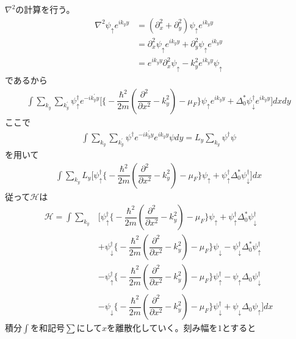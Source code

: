 \documentclass{jarticle}
\begin{document}
$\nabla^2$の計算を行う。
\begin{align}
\nabla^{2}\psi_{\uparrow}e^{ik_yy}&=(\partial_x^2+\partial_y^2)\psi_{\uparrow}e^{ik_yy}\\
                                                      &=\partial_x^2\psi_{\uparrow}e^{ik_yy}+\partial_y^2\psi_{\uparrow}e^{ik_yy}\\
                                                    &=e^{ik_yy}\partial_x^2\psi_{\uparrow}-k^{2}_ye^{ik_yy}\psi_{\uparrow}
\end{align}
であるから
\begin{align}
\int\displaystyle\sum_{k_y}\sum_{k_y^{'}}\psi_{\uparrow}^{\dagger}e^{-ik_y^{'}y}\Big[\big\{-\dfrac{\hbar^2}{2m}(\dfrac{\partial^{2}}{\partial x^2}-k^{2}_y)-\mu_F\big\}\psi_{\uparrow}e^{ik_yy}+\Delta^{*}_0\psi_{\downarrow}^{\dagger}e^{ik_yy}\Big]dxdy
\end{align}
ここで
\begin{align}
\int\displaystyle\sum_{k_y}\sum_{k_y^{'}}\psi^{\dagger}e^{-ik_y^{'}y}e^{ik_yy}{\psi}dy=L_y\sum_{k_y}\psi^{\dagger}\psi
\end{align}
を用いて
\begin{align}
\int\displaystyle\sum_{k_y}L_y\Big[\psi_{\uparrow}^{\dagger}\big\{-\dfrac{\hbar^2}{2m}(\dfrac{\partial^{2}}{\partial x^2}-k^{2}_y)-\mu_F\big\}\psi_{\uparrow}+\psi_{\uparrow}^{\dagger}\Delta^{*}_0\psi_{\downarrow}^{\dagger}\Big]dx
\end{align}
従って$\mathcal{H}$は
\begin{align}
\mathcal{H}=\int\displaystyle\sum_{k_y}&\Big[\psi_{\uparrow}^{\dagger}\big\{-\dfrac{\hbar^2}{2m}(\dfrac{\partial^{2}}{\partial x^2}-k^{2}_y)-\mu_F\big\}\psi_{\uparrow}+\psi_{\uparrow}^{\dagger}\Delta^{*}_0\psi_{\downarrow}^{\dagger}\\
&+\psi_{\downarrow}^{\dagger}\big\{-\dfrac{\hbar^2}{2m}(\dfrac{\partial^{2}}{\partial x^2}-k^{2}_y)-\mu_F\big\}\psi_{\downarrow}-\psi_{\downarrow}^{\dagger}\Delta^{*}_0\psi_{\uparrow}^{\dagger}\\
&-\psi_{\uparrow}^{\dagger}\big\{-\dfrac{\hbar^2}{2m}(\dfrac{\partial^{2}}{\partial x^2}-k^{2}_y)-\mu_F\big\}\psi_{\uparrow}^{\dagger}-\psi_{\uparrow}\Delta_0\psi_{\downarrow}^{\dagger}\\
&-\psi_{\downarrow}\big\{-\dfrac{\hbar^2}{2m}(\dfrac{\partial^{2}}{\partial x^2}-k^{2}_y)-\mu_F\big\}\psi_{\downarrow}^{\dagger}+\psi_{\downarrow}\Delta_0\psi_{\uparrow}\Big]dx
\end{align}
積分$\int$を和記号$\sum$にして$x$を離散化していく。刻み幅を$1$とすると
\end{document}
